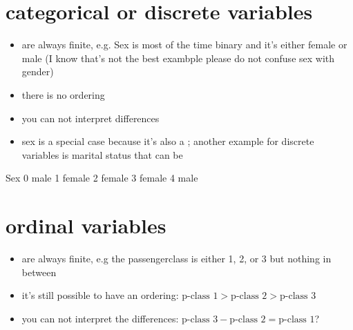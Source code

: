 \documentclass[letterpaper,10pt,english]{jupyterBook}
\begin{document}
\section{categorical or discrete variables}
\label{\detokenize{Data_Basics:categorical-or-discrete-variables}}\begin{itemize}
\item {} 
\sphinxAtStartPar
are always finite, e.g. Sex is most of the time binary and it’s either female or male (I know that’s not the best exambple \sphinxhyphen{} please do not confuse sex with gender)

\item {} 
\sphinxAtStartPar
there is no ordering

\item {} 
\sphinxAtStartPar
you can not interpret differences

\item {} 
\sphinxAtStartPar
sex is a special case because it’s also a ; another example for discrete variables is marital status that can be 

\end{itemize}

\begin{sphinxVerbatim}[commandchars=\\\{\}]
      Sex
0    male
1  female
2  female
3  female
4    male
\end{sphinxVerbatim}


\section{ordinal variables}
\label{\detokenize{Data_Basics:ordinal-variables}}\begin{itemize}
\item {} 
\sphinxAtStartPar
are always finite, e.g the passenger\sphinxhyphen{}class is either 1, 2, or 3 but nothing in between

\item {} 
\sphinxAtStartPar
it’s still possible to have an ordering: \(\text{p-class 1} > \text{p-class 2} > \text{p-class 3}\)

\item {} 
\sphinxAtStartPar
you can not interpret the differences: \(\text{p-class 3} - \text{p-class 2} = \text{p-class 
1}\)?

\end{itemize}
\end{document}

